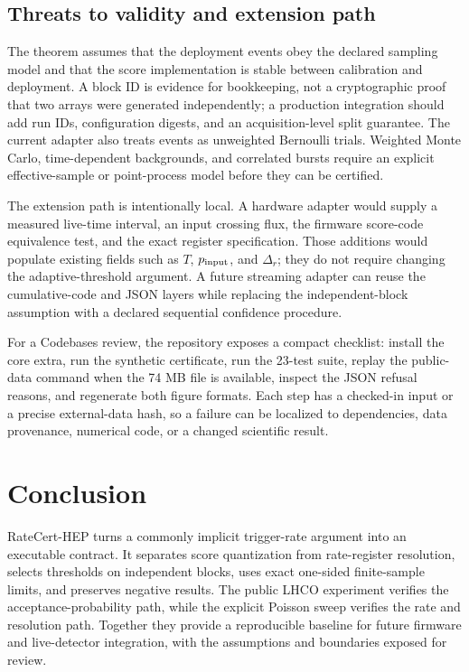 \documentclass[submission, Phys]{SciPost}
\begin{document}
\subsection{Threats to validity and extension path}

The theorem assumes that the deployment events obey the declared sampling model
and that the score implementation is stable between calibration and
deployment.  A block ID is evidence for bookkeeping, not a cryptographic proof
that two arrays were generated independently; a production integration should
add run IDs, configuration digests, and an acquisition-level split guarantee.
The current adapter also treats events as unweighted Bernoulli trials.  Weighted
Monte Carlo, time-dependent backgrounds, and correlated bursts require an
explicit effective-sample or point-process model before they can be certified.

The extension path is intentionally local.  A hardware adapter would supply a
measured live-time interval, an input crossing flux, the firmware score-code
equivalence test, and the exact register specification.  Those additions would
populate existing fields such as $T$, $p_{\rm input}$, and $\Delta_r$; they do
not require changing the adaptive-threshold argument.  A future streaming
adapter can reuse the cumulative-code and JSON layers while replacing the
independent-block assumption with a declared sequential confidence procedure.

For a Codebases review, the repository exposes a compact checklist: install the
core extra, run the synthetic certificate, run the 23-test suite, replay the
public-data command when the 74 MB file is available, inspect the JSON refusal
reasons, and regenerate both figure formats.  Each step has a checked-in input
or a precise external-data hash, so a failure can be localized to dependencies,
data provenance, numerical code, or a changed scientific result.

\section{Conclusion}
\label{sec:conclusion}

RateCert-HEP turns a commonly implicit trigger-rate argument into an executable
contract.  It separates score quantization from rate-register resolution,
selects thresholds on independent blocks, uses exact one-sided finite-sample
limits, and preserves negative results.  The public LHCO experiment verifies
the acceptance-probability path, while the explicit Poisson sweep verifies the
rate and resolution path.  Together they provide a reproducible baseline for
future firmware and live-detector integration, with the assumptions and
boundaries exposed for review.
\end{document}
